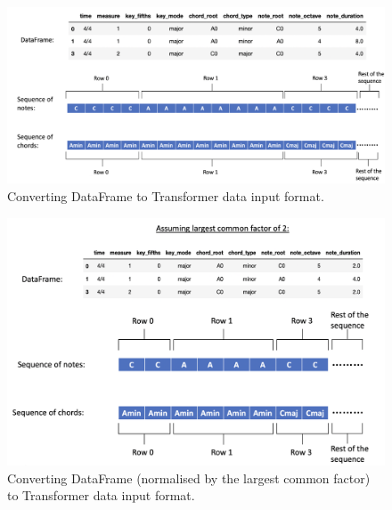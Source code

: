 \begin{figure}
    \centering
    \includegraphics[scale=0.3]{Figures/Transformer 2}
    \decoRule
    \caption{Converting DataFrame to Transformer data input format.}
    \label{fig:TransformerData}
    \end{figure}

\begin{figure}
    \centering
    \includegraphics[scale=0.3]{Figures/Transformer LCF}
    \decoRule
    \caption{Converting DataFrame (normalised by the largest common factor) to Transformer data input format.}
    \label{fig:Transformer LCF}
    \end{figure}

